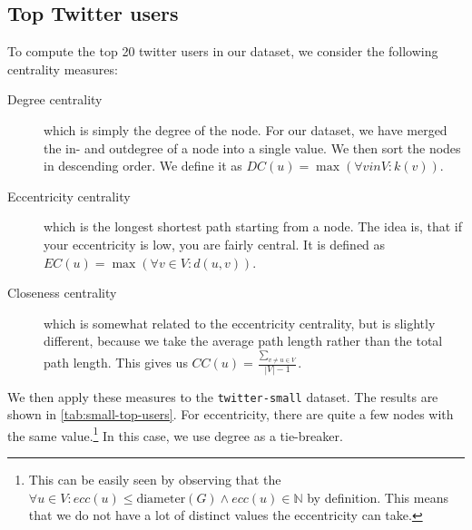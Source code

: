\documentclass[a4paper,10pt,hidelinks]{article}
\begin{document}
\subsection{Top Twitter users}
To compute the top 20 twitter users in our dataset, we consider the following centrality measures:

\begin{description}
	\item[Degree centrality] which is simply the degree of the node. For our dataset, we have merged the in- and outdegree of a node into a single value. We then sort the nodes in descending order. We define it as $DC(u) = \max(\forall v in V : k(v))$.

	\item[Eccentricity centrality] which is the longest shortest path starting from a node. The idea is, that if your eccentricity is low, you are fairly central. It is defined as $EC(u) = \max(\forall v \in V : d(u, v))$.

	\item[Closeness centrality] which is somewhat related to the eccentricity centrality, but is slightly different, because we take the average path length rather than the total path length. This gives us $CC(u) = \frac{\sum_{v \neq u \in V}}{|V| - 1}$.
\end{description}

We then apply these measures to the \texttt{twitter-small} dataset. The results are shown in \autoref{tab:small-top-users}. For eccentricity, there are quite a few nodes with the same value.\footnote{This can be easily seen by observing that the $\forall u \in V: ecc(u) \leq \text{diameter}(G) \land ecc(u) \in \mathbb{N}$ by definition. This means that we do not have a lot of distinct values the eccentricity can take.} In this case, we use degree as a tie-breaker.
\end{document}
